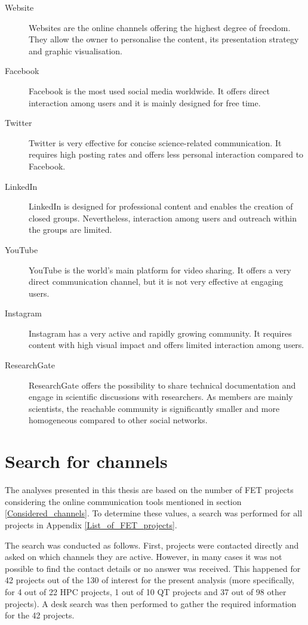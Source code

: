 \begin{description}
 \item [Website] Websites are the online channels offering the highest degree of freedom. They allow the owner to personalise the content, its presentation strategy and graphic visualisation.
 \item [Facebook] Facebook is the most used social media worldwide. It offers direct interaction among users and it is mainly designed for free time.  
 \item [Twitter] Twitter is very effective for concise science-related communication. It requires high posting rates and offers less personal interaction compared to Facebook.
 \item [LinkedIn] LinkedIn is designed for professional content and enables the creation of closed groups. Nevertheless, interaction among users and outreach within the groups are limited.
 \item [YouTube] YouTube is the world's main platform for video sharing. It offers a very direct communication channel, but it is not very effective at engaging users.
 \item [Instagram] Instagram has a very active and rapidly growing community. It requires content with high visual impact and offers limited interaction among users.
 \item [ResearchGate] ResearchGate offers the possibility to share technical documentation and engage in scientific discussions with researchers. As members are mainly scientists, the reachable community is significantly smaller and more homogeneous compared to other social networks.  
\end{description}

\section{Search for channels}
The analyses presented in this thesis are based on the number of FET projects considering the online communication tools mentioned in section \ref{Considered_channels}. To determine these values, a search was performed for all projects in Appendix \ref{List_of_FET_projects}. 

The search was conducted as follows. First, projects were contacted directly and asked on which channels they are active. However, in many cases it was not possible to find the contact details or no answer was received. This happened for 42 projects out of the 130 of interest for the present analysis (more specifically, for 4 out of 22 HPC projects, 1 out of 10 QT projects and 37 out of 98 other projects). A desk search was then performed to gather the required information for the 42 projects. 

